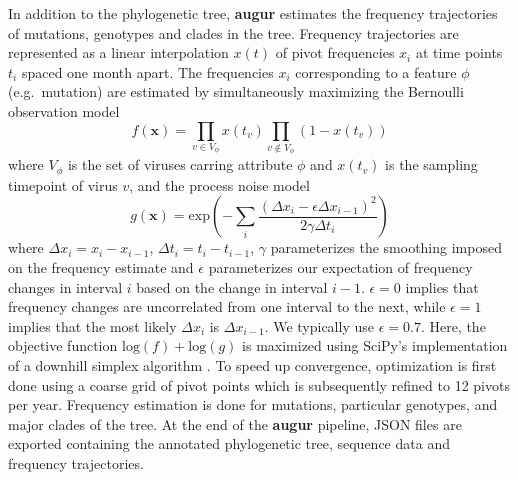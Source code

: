 \documentclass{bioinfo}
\newcommand{\augur}{\textbf{augur}}
\begin{document}
In addition to the phylogenetic tree, \augur{} estimates the frequency trajectories of mutations, genotypes and clades in the tree. 
Frequency trajectories are represented as a linear interpolation $x(t)$ of pivot frequencies $x_i$ at time points $t_i$ spaced one month apart. 
The frequencies $x_i$ corresponding to a feature $\phi$ (e.g.\ mutation) are estimated by simultaneously maximizing the Bernoulli observation model 
\begin{equation}
	\label{eq:obs}
	f(\mathbf{x}) = \prod_{v\in V_\phi} x(t_v) \prod_{v\notin V_{\phi}} (1-x(t_v))
\end{equation}
where $V_{\phi}$ is the set of viruses carring attribute $\phi$ and $x(t_v)$ is the sampling timepoint of virus $v$, and the process noise model
\begin{equation}
	\label{eq:freq}
	g(\mathbf{x}) = \mathrm{exp}\left(
		-\sum_i \frac{(\Delta x_i - \epsilon\Delta x_{i-1})^2}{2\gamma \Delta t_i}
	\right)
\end{equation}
where $\Delta x_i = x_i-x_{i-1}$, $\Delta t_i = t_i-t_{i-1}$, $\gamma$ parameterizes the smoothing imposed on the frequency estimate and $\epsilon$ parameterizes our expectation of frequency changes in interval $i$ based on the  change in interval $i-1$.
$\epsilon=0$ implies that frequency changes are uncorrelated from one interval to the next, while $\epsilon=1$ implies that the most likely $\Delta x_i$ is $\Delta x_{i-1}$.
We typically use $\epsilon = 0.7$.
Here, the objective function $\mathrm{log}(f) + \mathrm{log}(g)$ is maximized using SciPy's implementation of a downhill simplex algorithm \citep{oliphant_python_2007}.
To speed up convergence, optimization is first done using a coarse grid of pivot points which is subsequently refined to 12 pivots per year. Frequency estimation is done for mutations, particular genotypes, and major clades of the tree.
At the end of the \augur{} pipeline, JSON files are exported containing the annotated phylogenetic tree, sequence data and frequency trajectories.
\end{document}
